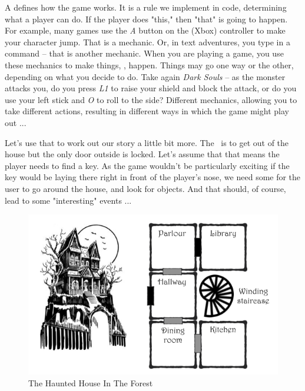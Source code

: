   \begin{Gmd} A \textit{\gamemechanic} defines how the game works. It is a rule we implement in code, determining what a player can do. If the player does "this," then "that" is going to happen. For example, many games use the \emph{A} button on the (Xbox) controller to make your character jump. That is a mechanic. Or, in text adventures, you type in a command -- that is another mechanic. When you are playing a game, you use these mechanics to make things, \textit{}, happen. Things may go one way or the other, depending on what you decide to do. Take again \emph{Dark Souls} -- as the monster attacks you, do you press \emph{L1} to raise your shield and block the attack, or do you use your left stick and \emph{O} to roll to the side? Different mechanics, allowing you to take different actions, resulting in different ways in which the game might play out ...   \expend
  \end{Gmd}
  
Let's use that to work out our story a little bit more. The \victorycondition\ is to get out of the house but the only door outside is locked. Let's assume that that means the player needs to find a key. As the game wouldn't be particularly exciting if the key would be laying there right in front of the player's nose, we need some  for the user to go around the house, and look for objects. And that should, of course, lead to some "interesting" events ...  

\begin{figure}[h]
\centerline{\includegraphics[scale=.70]{images/p1ch2-hauntedhousemap.png}}
\caption{The Haunted House In The Forest}\label{fig:hauntedhousemap}
\end{figure}


